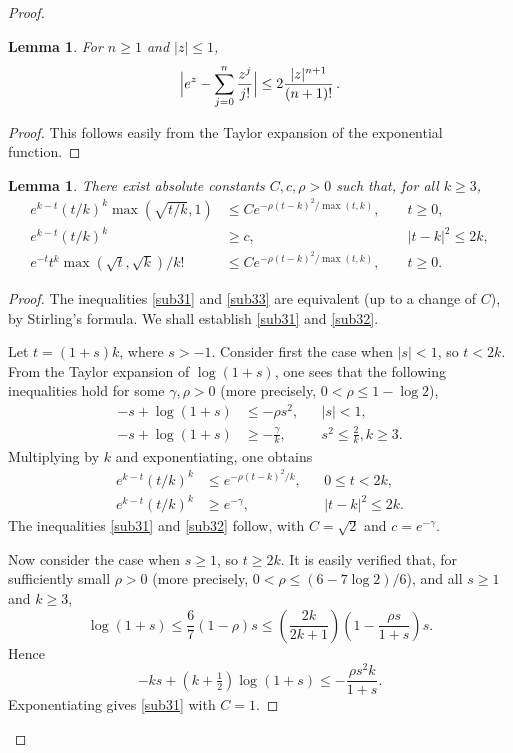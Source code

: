 \documentclass[11pt]{amsart}
\newtheorem{lemma}[theorem]{Lemma}
\theoremstyle{definition}
\theoremstyle{remark}
\numberwithin{equation}{section}
\begin{document}
\begin{proof}
\begin{lemma}\label{sub2} For $n\ge 1$ and $|z|\le 1$,
$$
\Bigl|e^z-\sum_{j=0}^n\frac{z^j}{j!}\Bigr|\le
2\frac{|z|^{n+1}}{(n+1)!}\,.
$$
\end{lemma}

\begin{proof} This follows easily from the Taylor expansion of the exponential
function. \end{proof}

\begin{lemma}\label{sub3} There exist absolute constants $C,c, \rho>0$ such that, for all $k\ge 3$,
\begin{align}
e^{k-t}(t/k)^k \max(\sqrt{t/k},1)&\le C e^{-\rho(t-k)^2/\max(t,k)},\,\, &&t\ge 0,  \label{sub31} \\
e^{k-t}(t/k)^k&\ge c,\qquad && |t-k|^2\le 2k, \label{sub32}\\
e^{-t} t^k \max(\sqrt{t},\sqrt{k}) / k! &\le C e^{-\rho(t-k)^2/\max(t,k)},\,\, &&t\ge 0. \label{sub33}
\end{align}
\end{lemma}

\begin{proof}   The inequalities \eqref{sub31} and \eqref{sub33} are equivalent (up to a change of $C$), by Stirling's formula.  We shall establish \eqref{sub31} and \eqref{sub32}.

Let $t = (1+s)k$, where $s>-1$.  Consider first the case when $|s| < 1$, so $t < 2k$.  From the Taylor expansion of $\log(1+s)$, one sees that the following inequalities hold for some $\gamma,\rho>0$ (more precisely, $0<\rho \le 1 - \log 2$),
\begin{align*}
-s + \log (1+s) &\le  - \rho s^2, &&|s|<1,  \\
-s + \log (1+s) &\ge - \frac{\gamma}{k}, && s^2 \le \frac{2}{k}, k\ge3.
\end{align*}
Multiplying by $k$ and exponentiating, one obtains
\begin{align*}
e^{k-t}(t/k)^k &\le  e^{-\rho(t-k)^2/k}, &&0\le t < 2k,\\
e^{k-t}(t/k)^k&\ge e^{-\gamma}, && |t-k|^2\le 2k.
\end{align*}
The inequalities \eqref{sub31} and \eqref{sub32} follow, with $C=\sqrt2$ and $c = e^{-\gamma}$.

Now consider the case when $s\ge1$, so $t\ge 2k$.  It is easily verified that, for sufficiently small $\rho>0$  (more precisely, $0 < \rho \le (6-7 \log2)/6$), and all $s\ge1$ and $k\ge3$,
$$
 \log(1+s)  \le  \frac{6}{7} (1-\rho) s \le \left( \frac{2k}{2k+1} \right) \left( 1 - \frac{\rho s}{1+s} \right) s.
$$
Hence
$$
-ks + \left(k + \tfrac12\right) \log(1+s) \le  - \frac{\rho s^2 k}{1+s}.
$$
Exponentiating gives \eqref{sub31} with $C=1$.
\end{proof}


\end{proof}
\end{document}
